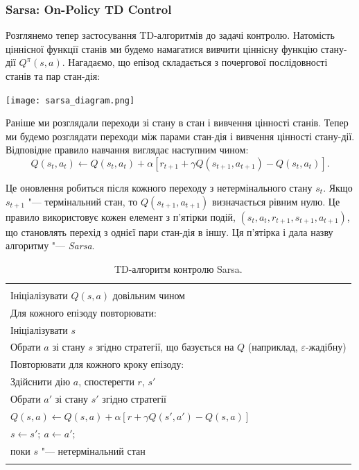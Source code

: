 \subsubsection{Sarsa: On-Policy TD Control}

Розглянемо тепер застосування TD-алгоритмів до задачі контролю. Натомість ціннісної функції станів ми будемо намагатися вивчити ціннісну функцію стану-дії $Q^\pi(s,a)$. Нагадаємо, що епізод складається з почергової послідовності станів та пар стан-дія:

\begin{center}\texttt{[image: sarsa\_diagram.png]}\end{center}

Раніше ми розглядали переходи зі стану в стан і вивчення цінності станів. Тепер ми будемо розглядати переходи між парами стан-дія і вивчення цінності стану-дії. Відповідне правило навчання виглядає наступним чином:
\begin{equation}
Q(s_t,a_t) \leftarrow Q(s_t,a_t) + \alpha\left[r_{t+1} + \gamma Q(s_{t+1},a_{t+1}) - Q(s_t, a_t)\right].
\end{equation}

Це оновлення робиться після кожного переходу з нетермінального стану $s_t$. Якщо $s_{t+1}$ "--- термінальний стан, то $Q(s_{t+1}, a_{t+1})$ визначається рівним нулю. Це правило використовує кожен елемент з п'ятірки подій, $(s_t,a_t,r_{t+1},s_{t+1},a_{t+1})$, що становлять перехід з однієї пари стан-дія в іншу. Ця п'ятірка і дала назву алгоритму "--- \emph{Sarsa}.

\begin{table}
\centering
\label{Sarsa_algorithm}
\begin{tabular}{|l|}
\hline\\
Ініціалізувати $Q(s,a)$ довільним чином\\
Для кожного епізоду повторювати:\\
\hspace{0.5cm} Ініціалізувати $s$\\
\hspace{0.5cm} Обрати $a$ зі стану $s$ згідно стратегії, що базується на $Q$ (наприклад, $\varepsilon$-жадібну)\\
\hspace{0.5cm} Повторювати для кожного кроку епізоду:\\
\hspace{1cm} 	Здійснити дію $a$, спостерегти $r$, $s'$\\
\hspace{1cm} 	Обрати $a'$ зі стану $s'$ згідно стратегії\\
\hspace{1cm} 	$Q(s,a) \leftarrow Q(s,a) + \alpha\left[r + \gamma Q(s',a') - Q(s,a)\right]$\\
\hspace{1cm} 	$s \leftarrow s';\ a \leftarrow a';$\\
\hspace{0.5cm} поки $s$ "--- нетермінальний стан\\
\\
\hline
\end{tabular}
\caption{TD-алгоритм контролю Sarsa.}
\end{table}

